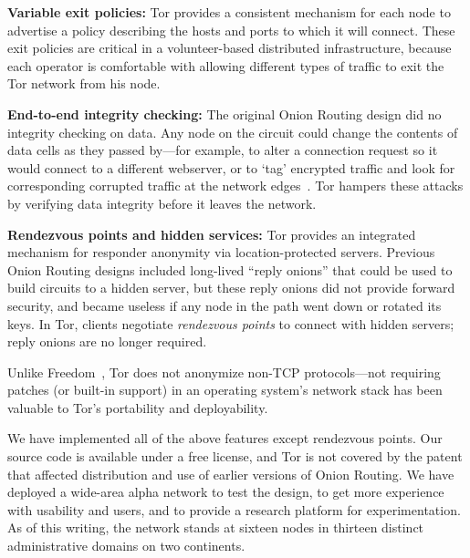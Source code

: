 \documentclass[times,10pt,twocolumn]{article}
\begin{document}
\textbf{Variable exit policies:} Tor provides a consistent mechanism
for each node to advertise a policy describing the hosts
and ports to which it will connect. These exit policies are critical
in a volunteer-based distributed infrastructure, because each operator
is comfortable with allowing different types of traffic to exit the Tor
network from his node.

\textbf{End-to-end integrity checking:} The original Onion Routing
design did no integrity checking on data. Any node on the
circuit could change the contents of data cells as they passed by---for
example, to alter a connection request so it would connect
to a different webserver, or to `tag' encrypted traffic and look for
corresponding corrupted traffic at the network edges~\cite{minion-design}.
Tor hampers these attacks by verifying data integrity before it leaves
the network.


\textbf{Rendezvous points and hidden services:}
Tor provides an integrated mechanism for responder anonymity via
location-protected servers.  Previous Onion Routing designs included
long-lived ``reply onions'' that could be used to build circuits
to a hidden server, but these reply onions did not provide forward
security, and became useless if any node in the path went down
or rotated its keys.  In Tor, clients negotiate {\it rendezvous points}
to connect with hidden servers; reply onions are no longer required.


Unlike Freedom~\cite{freedom2-arch}, Tor does not anonymize
non-TCP protocols---not requiring patches (or built-in support) in an
operating system's network stack has been valuable to Tor's
portability and deployability.

We have implemented all of the above features except rendezvous
points. Our source code is
available under a free license, and Tor
is not covered by the patent that affected distribution and use of
earlier versions of Onion Routing.
We have deployed a wide-area alpha network
to test the design, to get more experience with usability
and users, and to provide a research platform for experimentation.
As of this writing, the network stands at sixteen nodes in thirteen
distinct administrative domains on two continents.
\end{document}
